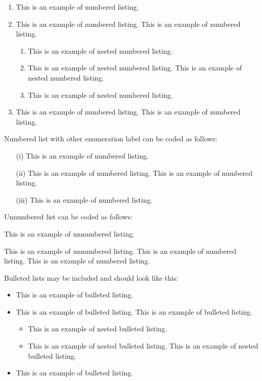 \documentclass{itor}
\theoremstyle{definition}
\theoremstyle{remark}
\begin{document}
\begin{enumerate}
\item This is an example of numbered listing.
\item This is an example of numbered listing. This is an example of numbered listing.
\begin{enumerate}
\item This is an example of nested numbered listing.
\item This is an example of nested numbered listing. This is an example of nested numbered listing.
\item This is an example of nested numbered listing.
\end{enumerate}
\item This is an example of numbered listing. This is an example of numbered listing.
\end{enumerate}

\noindent Numbered list with other enumeration label can be coded as follows:

\begin{enumerate}
\item[(i)] This is an example of numbered listing.
\item[(ii)] This is an example of numbered listing. This is an example of numbered listing.
\item[(iii)] This is an example of numbered listing.
\end{enumerate}

\noindent Unnumbered list can be coded as follows:

\begin{unnumlist}
\item This is an example of unnumbered listing.
\item This is an example of unnumbered listing. This is an example of numbered listing. This is an example of numbered listing.
\end{unnumlist}

\noindent Bulleted lists may be included and should look like this:
\begin{itemize}
\item This is an example of bulleted listing.
\item This is an example of bulleted listing. This is an example of bulleted listing.
\begin{itemize}
\item This is an example of nested bulleted listing.
\item This is an example of nested bulleted listing. This is an example of nested bulleted listing.
\end{itemize}
\item This is an example of bulleted listing.
\end{itemize}
\end{document}
